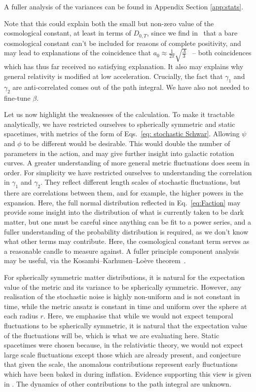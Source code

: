 \documentclass[aps,pra,amsmath,amssymb,amsthm,floatfix,nofootinbib,notitlepage,superscriptaddress,10pt]{revtex4-2}
\begin{document}
A fuller analysis of the variances can be found in Appendix Section \ref{app:stats}. 

Note that this could explain both the small but non-zero value of the cosmological constant, at least in terms of $D_{0,T}$, since we find in~\cite{grudka2023renormalisable} that a bare cosmological constant can't be included for reasons of complete positivity, and may lead to explanations of the coincidence that  $a_0\approx\frac{1}{2\pi}\sqrt{\frac{\Lambda}{3}}$~\cite{milgrom1983modification} -- both coincidences which has thus far received no satisfying explanation. It also may explains why general relativity is modified at low acceleration. Crucially, the fact that $\gamma_1$ and $\gamma_2$ are anti-correlated comes out of the path integral. We have also not needed to fine-tune $\beta$.



Let us now highlight the weaknesses of the calculation. To make it tractable analytically, we have restricted ourselves to spherically symmetric and static spacetimes, with metrics of the form of Eqs.~\eqref{eq: stochastic Schwar}. Allowing $\psi$ and $\phi$ to be different would be desirable. This would double the number of parameters in the action, and may give further insight into galactic rotation curves.    
A greater understanding of more general metric fluctuations does seem in order.
For simplicity we have restricted ourselves to understanding the correlation in $\gamma_1$ and $\gamma_2$. They reflect different length scales of stochastic fluctuations, but there are correlations between them, and for example, the higher powers in the expansion. 
Here, the full normal distribution reflected in Eq.~\eqref{eq:Faction} may provide some insight into the distribution of what is currently taken to be dark matter, but one must be careful since anything can be fit to a power series, and a fuller understanding of the probability distribution is required, as we don't know what other terms may contribute.
Here, the cosmological constant term serves as a reasonable candle to measure against. A fuller principle component analysis may be useful, via the Kosambi–Karhunen–Loève theorem~\cite{Love1978}. 

For spherically symmetric matter distributions, it is natural for the expectation value of the metric and its variance to be spherically symmetric. However, any realisation of the stochastic noise is highly non-uniform and is not constant in time, while the metric ansatz is constant in time and uniform over the sphere at each radius $r$. Here, we emphasise that while we would not expect temporal fluctuations to be spherically symmetric, it is natural that the expectation value of the fluctuations will be, which is what we are evaluating here.  Static spacetimes were chosen because, in the relativistic theory, we would not expect large scale fluctuations except those which are already present, and conjecture that given the scale, the anomalous contributions represent early fluctuations which have been baked in during inflation.  Evidence supporting this view is given in \cite{UCLcosmo}. The dynamics of other contributions to the path integral are unknown.
\end{document}
